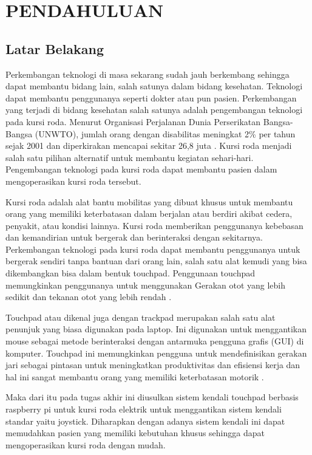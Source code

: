\chapter{PENDAHULUAN}

\section{Latar Belakang}

Perkembangan teknologi di masa sekarang sudah jauh berkembang sehingga dapat membantu bidang lain, salah satunya dalam bidang kesehatan. Teknologi dapat membantu penggunanya seperti dokter atau pun pasien. Perkembangan yang terjadi di bidang kesehatan salah satunya adalah pengembangan teknologi pada kursi roda. Menurut Organisasi Perjalanan Dunia Perserikatan Bangsa-Bangsa (UNWTO), jumlah orang dengan disabilitas meningkat 2\% per tahun sejak 2001 dan diperkirakan mencapai sekitar 26,8 juta \parencite{GujjarSmartWheelchair}. Kursi roda menjadi salah satu pilihan alternatif untuk membantu kegiatan sehari-hari. Pengembangan teknologi pada kursi roda dapat membantu pasien dalam mengoperasikan kursi roda tersebut. 

Kursi roda adalah alat bantu mobilitas yang dibuat khusus untuk membantu orang yang memiliki keterbatasan dalam berjalan atau berdiri akibat cedera, penyakit, atau kondisi lainnya. Kursi roda memberikan penggunanya kebebasan dan kemandirian untuk bergerak dan berinteraksi dengan sekitarnya. Perkembangan teknologi pada kursi roda dapat membantu penggunanya untuk bergerak sendiri tanpa bantuan dari orang lain, salah satu alat kemudi yang bisa dikembangkan bisa dalam bentuk touchpad. Penggunaan touchpad memungkinkan penggunanya untuk menggunakan Gerakan otot yang lebih sedikit dan tekanan otot yang lebih rendah \parencite{Salafi2009TouchScreen}.

Touchpad atau dikenal juga dengan trackpad merupakan salah satu alat penunjuk yang biasa digunakan pada laptop. Ini digunakan untuk menggantikan mouse sebagai metode berinteraksi dengan antarmuka pengguna grafis (GUI) di komputer. Touchpad ini memungkinkan pengguna untuk mendefinisikan gerakan jari sebagai pintasan untuk meningkatkan produktivitas dan efisiensi kerja dan hal ini sangat membantu orang yang memiliki keterbatasan motorik \parencite{Kumar2017SolarWheelChair}.

Maka dari itu pada tugas akhir ini diusulkan sistem kendali touchpad berbasis raspberry pi untuk kursi roda elektrik untuk menggantikan sistem kendali standar yaitu joystick. Diharapkan dengan adanya sistem kendali ini dapat memudahkan pasien yang memiliki kebutuhan khusus sehingga dapat mengoperasikan kursi roda dengan mudah.


